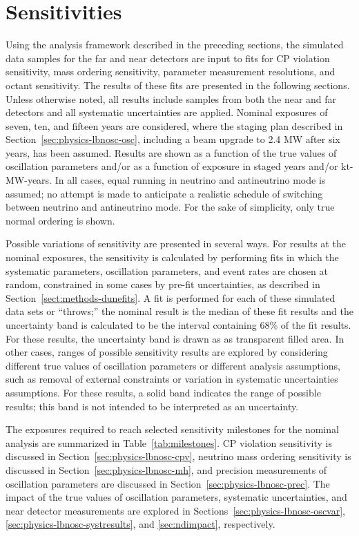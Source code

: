 \section{Sensitivities}
\label{sec:physics-lbnosc-results}

Using the analysis framework described in the preceding sections, the simulated data samples for the far and near detectors are input to fits for CP violation sensitivity, mass ordering sensitivity, parameter measurement resolutions, and octant sensitivity. The results of these fits are presented in the following sections. Unless otherwise noted, all results include samples from both the near and far detectors and all systematic uncertainties are applied. Nominal exposures of seven, ten, and fifteen years are considered, where the staging plan described in Section~\ref{sec:physics-lbnosc-osc}, including a beam upgrade to 2.4 MW after six years, has been assumed. Results are shown as a function of the true values of oscillation parameters and/or as a function of exposure in staged years and/or kt-MW-years. In all cases, equal running in neutrino and antineutrino mode is assumed; no attempt is made to anticipate a realistic schedule of switching between neutrino and antineutrino mode. For the sake of simplicity, only true normal ordering is shown.

Possible variations of sensitivity are presented in several ways. For results at the nominal exposures, the sensitivity is calculated by performing fits in which the systematic parameters, oscillation parameters, and event rates are chosen at random, constrained in some cases by pre-fit uncertainties, as described in Section~\ref{sect:methods-dunefits}. A fit is performed for each of these simulated data sets or ``throws;'' the nominal result is the median of these fit results and the uncertainty band is calculated to be the interval containing 68\% of the fit results. For these results, the uncertainty band is drawn as as transparent filled area. In other cases, ranges of possible sensitivity results are explored by considering different true values of oscillation parameters or different analysis assumptions, such as removal of external constraints or variation in systematic uncertainties assumptions. For these results, a solid band indicates the range of possible results; this band is not intended to be interpreted as an uncertainty.

The exposures required to reach selected sensitivity milestones for the nominal analysis are summarized in Table~\ref{tab:milestones}. CP violation sensitivity is discussed in Section~\ref{sec:physics-lbnosc-cpv}, neutrino mass ordering sensitivity is discussed in Section~\ref{sec:physics-lbnosc-mh}, and precision measurements of oscillation parameters are discussed in Section~\ref{sec:physics-lbnosc-prec}. The impact of the true values of oscillation parameters, systematic uncertainties, and near detector measurements are explored in Sections~\ref{sec:physics-lbnosc-oscvar}, \ref{sec:physics-lbnosc-systresults}, and \ref{sec:ndimpact}, respectively.

